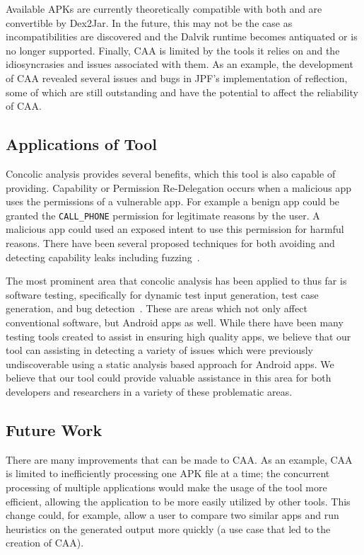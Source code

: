 \documentclass{sig-alternate-05-2015}
\begin{document}
Available APKs are currently theoretically compatible with both and are convertible by Dex2Jar. In the future, this may not be the case as incompatibilities are discovered and the Dalvik runtime becomes antiquated or is no longer supported. Finally, CAA is limited by the tools it relies on and the idiosyncrasies and issues associated with them. As an example, the development of CAA revealed several issues and bugs in JPF's implementation of reflection, some of which are still outstanding and have the potential to affect the reliability of CAA.


\subsection{Applications of Tool}

Concolic analysis provides several benefits, which this tool is also capable of providing. Capability or Permission Re-Delegation occurs when a malicious app uses the permissions of a vulnerable app. For example a benign app could be granted the \texttt{CALL\_PHONE} permission for legitimate reasons by the user. A malicious app could used an exposed intent to use this permission for harmful reasons. There have been several proposed techniques for both avoiding and detecting capability leaks including fuzzing~\cite{Yang:2014:IDC:2590296.2590316}.


The most prominent area that concolic analysis has been applied to thus far is software testing, specifically for dynamic test input generation, test case generation, and bug detection~\cite{Sen:2005:CCU:1081706.1081750, Wassermann:2008:DTI:1390630.1390661}. These are areas which not only affect conventional software, but Android apps as well.  While there have been many testing tools created to assist in ensuring high quality apps, we believe that our tool can assisting in detecting a variety of issues which were previously undiscoverable using a static analysis based approach for Android apps. We believe that our tool could provide valuable assistance in this area for both developers and researchers in a variety of these problematic areas.





\subsection{Future Work}
There are many improvements that can be made to CAA. As an example, CAA is limited to inefficiently processing one APK file at a time; the concurrent processing of multiple applications would make the usage of the tool more efficient, allowing the application to be more easily utilized by other tools. This change could, for example, allow a user to compare two similar apps and run heuristics on the generated output more quickly (a use case that led to the creation of CAA).
\end{document}
